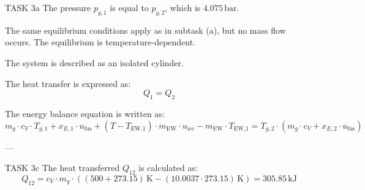 TASK 3a  
The pressure \( p_{g,1} \) is equal to \( p_{g,2} \), which is \( 4.075 \, \text{bar} \).  

The same equilibrium conditions apply as in subtask (a), but no mass flow occurs. The equilibrium is temperature-dependent.  

The system is described as an isolated cylinder.  

The heat transfer is expressed as:  
\[
Q_1 = Q_2
\]  

The energy balance equation is written as:  
\[
m_g \cdot c_V \cdot T_{g,1} + x_{E,1} \cdot u_{\text{fus}} + (T - T_{\text{EW,1}}) \cdot m_{\text{EW}} \cdot u_{\text{ice}} - m_{\text{EW}} \cdot T_{\text{EW,1}} = T_{g,2} \cdot \left( m_g \cdot c_V + x_{E,2} \cdot u_{\text{fus}} \right)
\]  

---

TASK 3c  
The heat transferred \( Q_{12} \) is calculated as:  
\[
Q_{12} = c_V \cdot m_g \cdot \left( (500 + 273.15) \, \text{K} - (10.0037 \cdot 273.15) \, \text{K} \right) = 305.85 \, \text{kJ}
\]